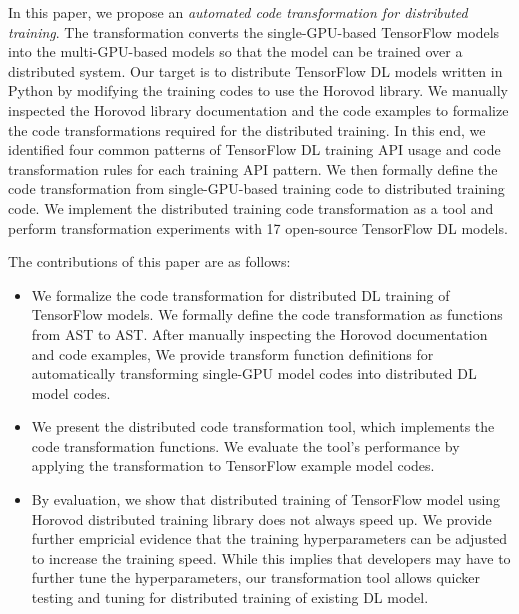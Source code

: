 In this paper, we propose an 
\textit{automated code transformation for distributed training}.
The transformation converts the single-GPU-based TensorFlow models
into the multi-GPU-based models so that the model can be trained
over a distributed system.
Our target is to distribute TensorFlow DL models written in Python
by modifying the training codes to use the Horovod library.
We manually inspected the Horovod library documentation and
the code examples to formalize the code transformations required for
the distributed training. In this end, we identified four common patterns of
TensorFlow DL training API usage and code transformation rules
for each training API pattern. 
We then formally define the code transformation from
single-GPU-based training code to distributed training code.
We implement the distributed training code transformation as a tool
and perform transformation experiments with 17 open-source TensorFlow DL models. 

The contributions of this paper are as follows:

\begin{itemize}
  \item We formalize the code transformation for distributed DL training
        of TensorFlow models. We formally define the code transformation
        as functions from AST to AST. After manually inspecting
        the Horovod documentation and code examples,
        We provide transform function definitions for 
        automatically transforming single-GPU model codes into
        distributed DL model codes.

  \item We present the distributed code transformation tool, which implements
        the code transformation functions. We evaluate the tool's performance
        by applying the transformation to TensorFlow example model codes.

  \item By evaluation, we show that distributed training of TensorFlow
    model using Horovod distributed training library does not always
    speed up. We provide further empricial evidence that the training
    hyperparameters can be adjusted to increase the training speed.
    While this implies that developers may have to further tune the
    hyperparameters, our transformation tool allows quicker testing and
    tuning for distributed training of existing DL model. 

\end{itemize}

